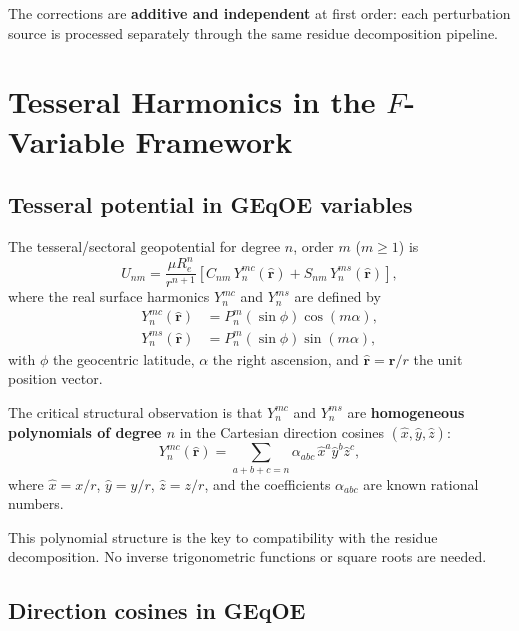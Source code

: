 \documentclass[11pt]{article}
\begin{document}
The corrections are \textbf{additive and independent} at first order: each
perturbation source is processed separately through the same residue
decomposition pipeline.


\section{Tesseral Harmonics in the \texorpdfstring{$F$}{F}-Variable Framework}
\label{sec:tesseral}

\subsection{Tesseral potential in GEqOE variables}

The tesseral/sectoral geopotential for degree $n$, order $m$ ($m \ge 1$) is
\begin{equation}
U_{nm}
= \frac{\mu R_e^n}{r^{n+1}}
\left[
C_{nm}\,Y_n^{mc}(\hat{\bm r})
+ S_{nm}\,Y_n^{ms}(\hat{\bm r})
\right],
\label{eq:tesseral_potential}
\end{equation}
where the real surface harmonics $Y_n^{mc}$ and $Y_n^{ms}$ are defined by
\begin{align}
Y_n^{mc}(\hat{\bm r})
&= P_n^m(\sin\phi)\cos(m\alpha), \\
Y_n^{ms}(\hat{\bm r})
&= P_n^m(\sin\phi)\sin(m\alpha),
\end{align}
with $\phi$ the geocentric latitude, $\alpha$ the right ascension, and
$\hat{\bm r} = \bm r / r$ the unit position vector.

The critical structural observation is that $Y_n^{mc}$ and $Y_n^{ms}$ are
\textbf{homogeneous polynomials of degree $n$} in the Cartesian direction
cosines $(\hat x, \hat y, \hat z)$:
\begin{equation}
Y_n^{mc}(\hat{\bm r})
= \sum_{a+b+c=n} \alpha_{abc}\, \hat x^a \hat y^b \hat z^c,
\end{equation}
where $\hat x = x/r$, $\hat y = y/r$, $\hat z = z/r$, and the
coefficients $\alpha_{abc}$ are known rational numbers.

This polynomial structure is the key to compatibility with the residue
decomposition. No inverse trigonometric functions or square roots are
needed.

\subsection{Direction cosines in GEqOE}
\end{document}
